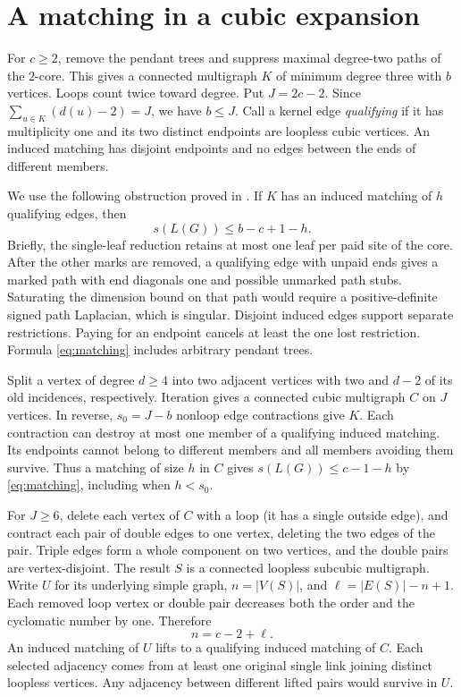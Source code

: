 \documentclass[11pt]{article}
\begin{document}
\section{A matching in a cubic expansion}
For $c\ge2$, remove the pendant trees and suppress maximal degree-two paths of the $2$-core. This gives a connected multigraph $K$ of minimum degree three with $b$ vertices. Loops count twice toward degree. Put $J=2c-2$. Since $\sum_{u\in K}(d(u)-2)=J$, we have $b\le J$. Call a kernel edge \emph{qualifying} if it has multiplicity one and its two distinct endpoints are loopless cubic vertices. An induced matching has disjoint endpoints and no edges between the ends of different members.

We use the following obstruction proved in \cite[Lemma 2.1]{finite}. If $K$ has an induced matching of $h$ qualifying edges, then
\begin{equation}\label{eq:matching}
 s(L(G))\le b-c+1-h .
\end{equation}
Briefly, the single-leaf reduction retains at most one leaf per paid site of the core. After the other marks are removed, a qualifying edge with unpaid ends gives a marked path with end diagonals one and possible unmarked path stubs. Saturating the dimension bound on that path would require a positive-definite signed path Laplacian, which is singular. Disjoint induced edges support separate restrictions. Paying for an endpoint cancels at least the one lost restriction. Formula \eqref{eq:matching} includes arbitrary pendant trees.

Split a vertex of degree $d\ge4$ into two adjacent vertices with two and $d-2$ of its old incidences, respectively. Iteration gives a connected cubic multigraph $C$ on $J$ vertices. In reverse, $s_0=J-b$ nonloop edge contractions give $K$. Each contraction can destroy at most one member of a qualifying induced matching. Its endpoints cannot belong to different members and all members avoiding them survive. Thus a matching of size $h$ in $C$ gives $s(L(G))\le c-1-h$ by \eqref{eq:matching}, including when $h<s_0$.

For $J\ge6$, delete each vertex of $C$ with a loop (it has a single outside edge), and contract each pair of double edges to one vertex, deleting the two edges of the pair. Triple edges form a whole component on two vertices, and the double pairs are vertex-disjoint. The result $S$ is a connected loopless subcubic multigraph. Write $U$ for its underlying simple graph, $n=|V(S)|$, and $\ell=|E(S)|-n+1$. Each removed loop vertex or double pair decreases both the order and the cyclomatic number by one. Therefore
\begin{equation}\label{eq:order}
 n=c-2+\ell .
\end{equation}
An induced matching of $U$ lifts to a qualifying induced matching of $C$. Each selected adjacency comes from at least one original single link joining distinct loopless vertices. Any adjacency between different lifted pairs would survive in $U$.
\end{document}
